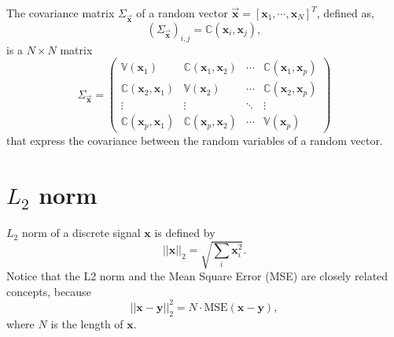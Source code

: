 The covariance matrix $\Sigma_{\overrightarrow{\mathbf{x}}}$ of a random vector $\overrightarrow{\mathbf{x}}=[\mathbf{x}_1,\cdots,\mathbf{x}_N]^T$, defined as,
\begin{equation}
  (\Sigma_{\overrightarrow{\mathbf{x}}})_{i,j}=\mathbb{C}(\mathbf{x}_i,\mathbf{x}_j),
\end{equation}
is a $N\times N$ matrix
\begin{equation}
\Sigma_{\overrightarrow{\mathbf{x}}} = 
\begin{pmatrix}
\mathbb{V}(\mathbf{x}_1) & \mathbb{C}(\mathbf{x}_1, \mathbf{x}_2) & \cdots & \mathbb{C}(\mathbf{x}_1, \mathbf{x}_p) \\
\mathbb{C}(\mathbf{x}_2, \mathbf{x}_1) & \mathbb{V}(\mathbf{x}_2) & \cdots & \mathbb{C}(\mathbf{x}_2, \mathbf{x}_p) \\
\vdots & \vdots & \ddots & \vdots \\
\mathbb{C}(\mathbf{x}_p, \mathbf{x}_1) & \mathbb{C}(\mathbf{x}_p, \mathbf{x}_2) & \cdots & \mathbb{V}(\mathbf{x}_p)
\end{pmatrix}
\end{equation}
that express the covariance between the random variables of a random vector.


\section{$L_2$ norm}
\label{sec:L2_norm}

$L_2$ norm of a discrete signal $\mathbf{x}$ is defined by
\begin{equation}
  ||\mathbf{x}||_2 = \sqrt{\sum_i\mathbf{x}_i^2}.
\end{equation}
Notice that the L2 norm and the Mean Square Error (MSE) are closely
related concepts, because
\begin{equation}
  ||\mathbf{x} - \mathbf{y}||_2^2 = N\cdot\text{MSE}(\mathbf{x} - \mathbf{y}),
\end{equation}
where $N$ is the length of $\mathbf{x}$.


